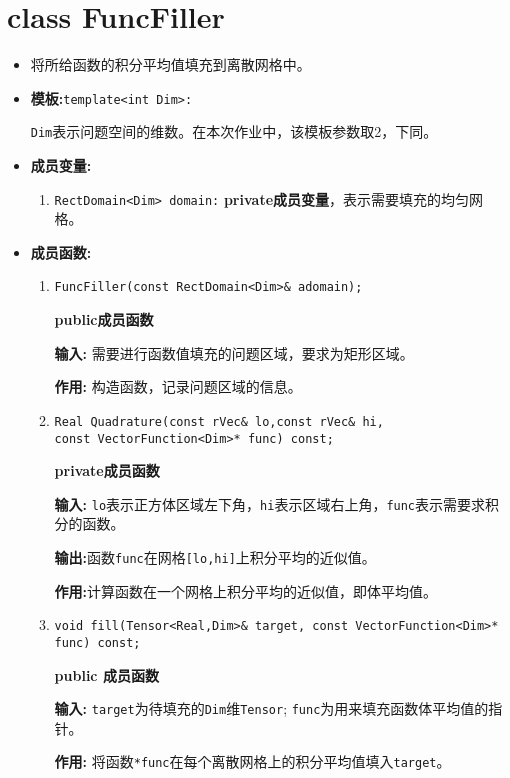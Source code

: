 \documentclass[UTF8]{ctexart}
\theoremstyle{plain}
\theoremstyle{definition}
\theoremstyle{remark}
\begin{document}
\section{class FuncFiller}
\begin{itemize}
    \item 将所给函数的积分平均值填充到离散网格中。
    \item \textbf{模板:}\texttt{template<int Dim>:}
    
    \texttt{Dim}表示问题空间的维数。在本次作业中，该模板参数取2，下同。

    \item \textbf{成员变量:}
    \begin{enumerate}
        \item \texttt{RectDomain<Dim> domain:} \textbf{private成员变量}，表示需要填充的均匀网格。
    \end{enumerate}

    \item \textbf{成员函数:}
    \begin{enumerate}
        \item \texttt{FuncFiller(const RectDomain<Dim>\& adomain);}
        
        \textbf{public成员函数}
        
        \textbf{输入:} 需要进行函数值填充的问题区域，要求为矩形区域。

        \textbf{作用:} 构造函数，记录问题区域的信息。
        \item \texttt{Real Quadrature(const rVec\& lo,const rVec\& hi,\\const VectorFunction<Dim>* func) const;}
        
        \textbf{private成员函数}
        
        \textbf{输入:} \texttt{lo}表示正方体区域左下角，\texttt{hi}表示区域右上角，\texttt{func}表示需要求积分的函数。

        \textbf{输出:}函数\texttt{func}在网格\texttt{[lo,hi]}上积分平均的近似值。

        \textbf{作用:}计算函数在一个网格上积分平均的近似值，即体平均值。

        \item \texttt{void fill(Tensor<Real,Dim>\& target, const VectorFunction<Dim>* func) const;} 
        
        \textbf{public 成员函数}

        \textbf{输入:} \texttt{target}为待填充的\texttt{Dim}维\texttt{Tensor}; \texttt{func}为用来填充函数体平均值的指针。

        \textbf{作用:} 将函数\texttt{*func}在每个离散网格上的积分平均值填入\texttt{target}。
    \end{enumerate}
\end{itemize}
\end{document}
